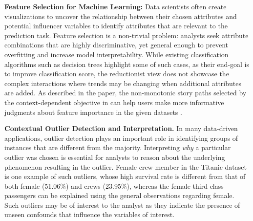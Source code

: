\npar \textbf{Feature Selection for Machine Learning:} Data scientists often create visualizations to uncover the relationship between their chosen attributes and potential influencer variables to identify attributes that are relevant to the prediction task. Feature selection is a non-trivial problem: analysts seek attribute combinations that are highly discriminative, yet general enough to prevent overfitting and increase model interpretability. While existing classification algorithms such as decision trees highlight some of such cases, as their end-goal is to improve classification score, the reductionist view does not showcase the complex interactions where trends may be changing when additional attributes are added. As described in the paper, the non-monotonic story paths selected by the context-dependent objective in \system can help users make more informative judgments about feature importance in the given datasets . 

\npar \textbf{Contextual Outlier Detection and Interpretation.} In many data-driven applications, outlier detection plays an important role in identifying groups of instances that are different from the majority. Interpreting \textit{why} a particular outlier was chosen is essential for analysts to reason about the underlying phenomenon resulting in the outlier. Female crew member in the Titanic dataset is one example of such outliers, whose high survival rate is different from that of both female (51.06\%) and crews (23.95\%), whereas the female third class passengers can be explained using the general observations regarding female. Such outliers may be of interest to the analyst as they indicate the presence of unseen confounds that influence the variables of interest.
